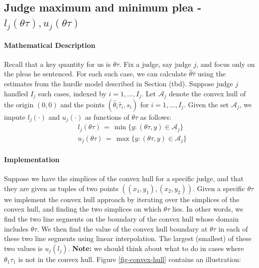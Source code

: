 \documentclass[11pt]{article}
\theoremstyle{ModifiedStyle}
\theoremstyle{ModifiedStyle}
\begin{document}
  \subsection{Judge maximum and minimum plea - $l_j(\theta \tau),u_j(\theta \tau)$}
    \paragraph{Mathematical Description} Recall that a key quantity for us is $\theta\tau$. Fix a judge, say judge $j$, and focus only on the pleas he sentenced. For each such case, we can calculate $\hat{\theta}\hat{\tau}$ using the estimates from the hurdle model described in Section (tbd). Suppose judge $j$ handled $I_j$ such cases, indexed by $i=1,\ldots,I_j$. Let $\mathcal{A}_j$ denote the convex hull of the origin $(0,0)$ and the points $(\hat{\theta}_i\hat{\tau}_i,s_i)$ for $i=1,\ldots,I_j$. Given the set $\mathcal{A}_j$, we impute $l_j(\cdot)$ and $u_j(\cdot)$ as functions of $\theta\tau$ as follows:
		\begin{align*}
			&l_j(\theta\tau) \,=\, \min\{y:(\theta\tau,y)\in\mathcal{A}_j \} \\
			&u_j(\theta\tau) \,=\, \max\{y:(\theta\tau,y)\in\mathcal{A}_j \}
		\end{align*}

     \paragraph{Implementation}
     Suppose we have the simplices of the convex hull for a specific judge, and that they are given as tuples of two points $((x_1,y_1),(x_2,y_2))$. Given a specific $\theta \tau$ we implement the convex hull approach by iterating over the simplices of the convex hull, and finding the two simplices on which $\theta \tau$ lies. In other words, we find the two line segments on the boundary of the convex hull whose domain includes $\theta \tau$. We then find the value of the convex hull boundary at $\theta \tau$ in each of these two line segments using linear interpolation. The largest (smallest) of these two values is $u_j (l_j)$. \textbf{Note:} we should think about what to do in cases where $\theta_1 \tau_1$ is not in the convex hull. Figure \ref{fig-convex-hull} contains an illustration:
\end{document}
